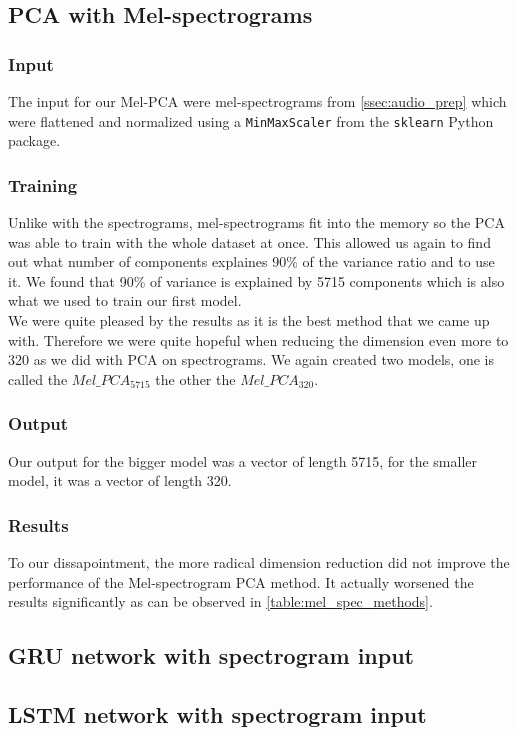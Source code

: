 \subsection{PCA with Mel-spectrograms}
\subsubsection{Input}
The input for our Mel-PCA were mel-spectrograms from \ref{ssec:audio_prep} which were flattened and normalized using a \texttt{MinMaxScaler} from the \texttt{sklearn} Python package.

\subsubsection{Training}
Unlike with the spectrograms, mel-spectrograms fit into the memory so the PCA was able to train with the whole dataset at once. This allowed us again to find out what number of components explaines 90\% of the variance ratio and to use it. We found that 90\% of variance is explained by 5715 components which is also what we used to train our first model. \\
We were quite pleased by the results as it is the best method that we came up with. Therefore we were quite hopeful when reducing the dimension even more to 320 as we did with PCA on spectrograms. We again created two models, one is called the $Mel\_PCA_{5715}$ the other the $Mel\_PCA_{320}$. 

\subsubsection{Output}
Our output for the bigger model was a vector of length 5715, for the smaller model, it was a vector of length 320.

\subsubsection{Results}
To our dissapointment, the more radical dimension reduction did not improve the performance of the Mel-spectrogram PCA method. It actually worsened the results significantly as can be observed in \ref{table:mel_spec_methods}. 
\subsection{GRU network with spectrogram input}
\subsection{LSTM network with spectrogram input}
